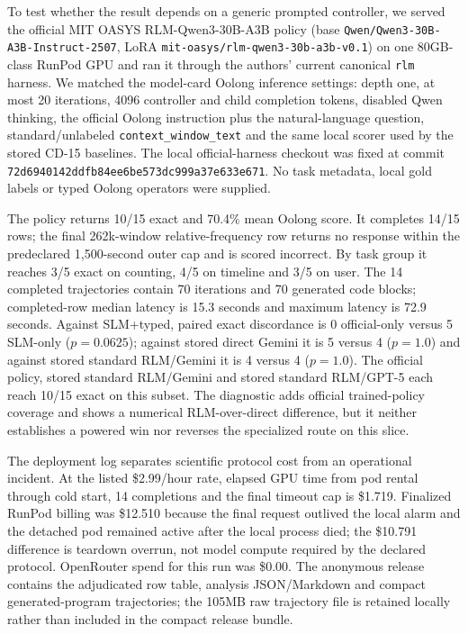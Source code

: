 \documentclass[letterpaper]{article}
\begin{document}
To test whether the result depends on a generic prompted controller, we served the official MIT OASYS RLM-Qwen3-30B-A3B policy (base \texttt{Qwen/Qwen3-30B-A3B-Instruct-2507}, LoRA \texttt{mit-oasys/rlm-qwen3-30b-a3b-v0.1}) on one 80GB-class RunPod GPU and ran it through the authors' current canonical \texttt{rlm} harness. We matched the model-card Oolong inference settings: depth one, at most 20 iterations, 4096 controller and child completion tokens, disabled Qwen thinking, the official Oolong instruction plus the natural-language question, standard/unlabeled \texttt{context\_window\_text} and the same local scorer used by the stored CD-15 baselines. The local official-harness checkout was fixed at commit \texttt{72d6940142ddfb84e\allowbreak e6be573dc999a37e633e671}. No task metadata, local gold labels or typed Oolong operators were supplied.

The policy returns 10/15 exact and 70.4\% mean Oolong score. It completes 14/15 rows; the final 262k-window relative-frequency row returns no response within the predeclared 1,500-second outer cap and is scored incorrect. By task group it reaches 3/5 exact on counting, 4/5 on timeline and 3/5 on user. The 14 completed trajectories contain 70 iterations and 70 generated code blocks; completed-row median latency is 15.3 seconds and maximum latency is 72.9 seconds. Against SLM+typed, paired exact discordance is 0 official-only versus 5 SLM-only ($p=0.0625$); against stored direct Gemini it is 5 versus 4 ($p=1.0$) and against stored standard RLM/Gemini it is 4 versus 4 ($p=1.0$). The official policy, stored standard RLM/Gemini and stored standard RLM/GPT-5 each reach 10/15 exact on this subset. The diagnostic adds official trained-policy coverage and shows a numerical RLM-over-direct difference, but it neither establishes a powered win nor reverses the specialized route on this slice.

The deployment log separates scientific protocol cost from an operational incident. At the listed \$2.99/hour rate, elapsed GPU time from pod rental through cold start, 14 completions and the final timeout cap is \$1.719. Finalized RunPod billing was \$12.510 because the final request outlived the local alarm and the detached pod remained active after the local process died; the \$10.791 difference is teardown overrun, not model compute required by the declared protocol. OpenRouter spend for this run was \$0.00. The anonymous release contains the adjudicated row table, analysis JSON/Markdown and compact generated-program trajectories; the 105MB raw trajectory file is retained locally rather than included in the compact release bundle.
\end{document}
